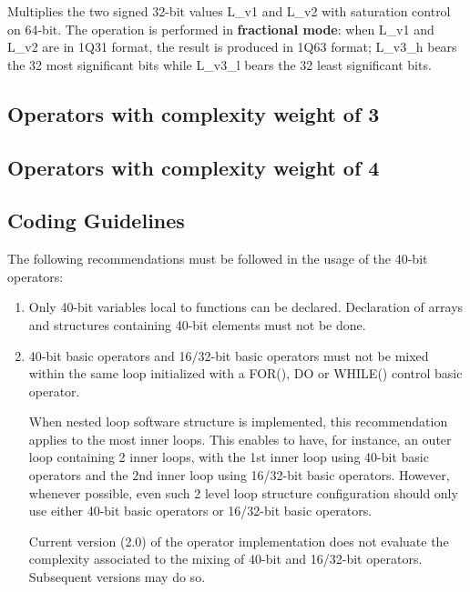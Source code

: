 
Multiplies the two signed 32-bit values L\_v1 and L\_v2 with saturation control on 64-bit.
The operation is performed in \textbf{fractional mode}: when L\_v1 and L\_v2 are in 1Q31 format, the result is produced in 1Q63 format; L\_v3\_h bears the 32 most significant bits while L\_v3\_l bears the 32 least significant bits.

\subsection{Operators with complexity weight of 3}


\subsection{Operators with complexity weight of 4}



\subsection{Coding Guidelines}

The following recommendations must be followed in the usage of the
40-bit operators:
\begin{enumerate}
    \item Only 40-bit variables local to functions can be declared.
    Declaration of arrays and structures containing 40-bit elements
    must not be done.
    \item 40-bit basic operators and 16/32-bit basic
    operators must not be mixed within the same loop initialized with
    a FOR(), DO or WHILE() control basic operator.

    When nested loop software structure is implemented, this
    recommendation applies to the most inner loops. This enables to
    have, for instance, an outer loop containing 2 inner loops, with
    the 1st inner loop using 40-bit basic operators and the 2nd inner
    loop using 16/32-bit basic operators. However, whenever possible,
    even such 2 level loop structure configuration should only use
    either 40-bit basic operators or 16/32-bit basic operators.

    Current version (2.0) of the operator implementation does not
    evaluate the complexity associated to the mixing of 40-bit and
    16/32-bit operators. Subsequent versions may do so.
\end{enumerate}

